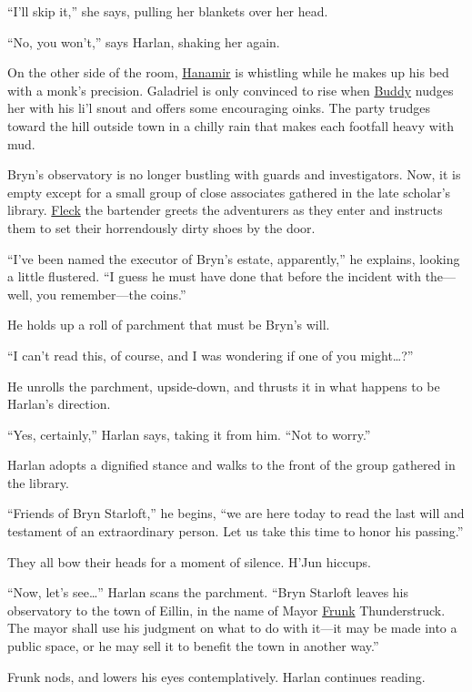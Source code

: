\documentclass[smalldemyvopaper,11pt,twoside,onecolumn,openright,extrafontsizes]{memoir}
\begin{document}
``I'll skip it,'' she says, pulling her blankets over her head.

``No, you won't,'' says Harlan, shaking her again.

On the other side of the room, \href{/characters/hanamir/}{Hanamir} is
whistling while he makes up his bed with a monk's precision. Galadriel
is only convinced to rise when \href{/characters/buddy/}{Buddy} nudges
her with his li'l snout and offers some encouraging oinks. The party
trudges toward the hill outside town in a chilly rain that makes each
footfall heavy with mud.

Bryn's observatory is no longer bustling with guards and investigators.
Now, it is empty except for a small group of close associates gathered
in the late scholar's library. \href{/characters/fleck/}{Fleck} the
bartender greets the adventurers as they enter and instructs them to set
their horrendously dirty shoes by the door.

``I've been named the executor of Bryn's estate, apparently,'' he
explains, looking a little flustered. ``I guess he must have done that
before the incident with the---well, you remember---the coins.''

He holds up a roll of parchment that must be Bryn's will.

``I can't read this, of course, and I was wondering if one of you
might\ldots?''

He unrolls the parchment, upside-down, and thrusts it in what happens to
be Harlan's direction.

``Yes, certainly,'' Harlan says, taking it from him. ``Not to worry.''

Harlan adopts a dignified stance and walks to the front of the group
gathered in the library.

``Friends of Bryn Starloft,'' he begins, ``we are here today to read the
last will and testament of an extraordinary person. Let us take this
time to honor his passing.''

They all bow their heads for a moment of silence. H'Jun hiccups.

``Now, let's see\ldots{}'' Harlan scans the parchment. ``Bryn Starloft
leaves his observatory to the town of Eillin, in the name of Mayor
\href{/characters/frunk/}{Frunk} Thunderstruck. The mayor shall use his
judgment on what to do with it---it may be made into a public space, or
he may sell it to benefit the town in another way.''

Frunk nods, and lowers his eyes contemplatively. Harlan continues
reading.
\end{document}
